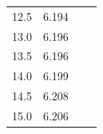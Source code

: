 \documentclass[a4paper,12pt]{article}
\begin{document}
\begin{table}[h]
{\begin{tabular}{|r|r|rcrrrr}
12.5                   & 6.194                  & \multicolumn{1}{r}{}                   & \multicolumn{5}{c}{}                                                                                                                                                                                                               \\ \cline{1-2}
13.0                   & 6.196                  & \multicolumn{1}{r}{}                   & \multicolumn{5}{c}{}                                                                                                                                                                                                               \\ \cline{1-2}
13.5                   & 6.196                  & \multicolumn{1}{r}{}                   & \multicolumn{5}{c}{}                                                                                                                                                                                                               \\ \cline{1-2}
14.0                   & 6.199                  & \multicolumn{1}{r}{}                   & \multicolumn{5}{c}{}                                                                                                                                                                                                               \\ \cline{1-2}
14.5                   & 6.208                  & \multicolumn{1}{r}{}                   & \multicolumn{5}{c}{}                                                                                                                                                                                                               \\ \cline{1-2}
15.0                   & 6.206                  & \multicolumn{1}{r}{}                   & \multicolumn{5}{c}{}                                                                                                                                                                                                               \\ \cline{1-2}
\end{tabular}
}
\end{table}
\end{document}
